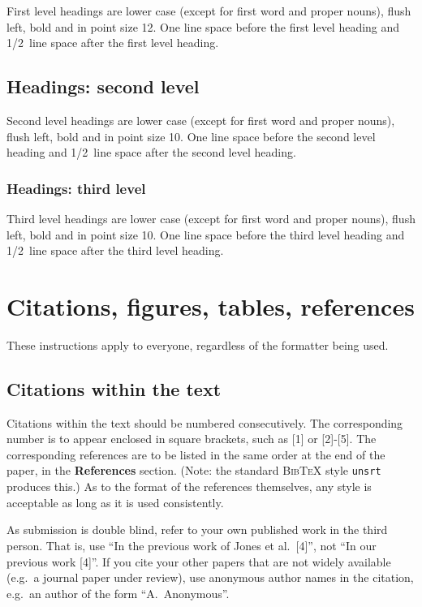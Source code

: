 \documentclass{article} %
\begin{document}
First level headings are lower case (except for first word and proper nouns),
flush left, bold and in point size 12. One line space before the first level
heading and 1/2~line space after the first level heading.

\subsection{Headings: second level}

Second level headings are lower case (except for first word and proper nouns),
flush left, bold and in point size 10. One line space before the second level
heading and 1/2~line space after the second level heading.

\subsubsection{Headings: third level}

Third level headings are lower case (except for first word and proper nouns),
flush left, bold and in point size 10. One line space before the third level
heading and 1/2~line space after the third level heading.

\section{Citations, figures, tables, references}
\label{others}

These instructions apply to everyone, regardless of the formatter being used.

\subsection{Citations within the text}

Citations within the text should be numbered consecutively. The corresponding
number is to appear enclosed in square brackets, such as [1] or [2]-[5]. The
corresponding references are to be listed in the same order at the end of the
paper, in the \textbf{References} section. (Note: the standard
\textsc{Bib\TeX} style \texttt{unsrt} produces this.) As to the format of the
references themselves, any style is acceptable as long as it is used
consistently.

As submission is double blind, refer to your own published work in the 
third person. That is, use ``In the previous work of Jones et al.\ [4]'',
not ``In our previous work [4]''. If you cite your other papers that
are not widely available (e.g.\ a journal paper under review), use
anonymous author names in the citation, e.g.\ an author of the
form ``A.\ Anonymous''. 
\end{document}

